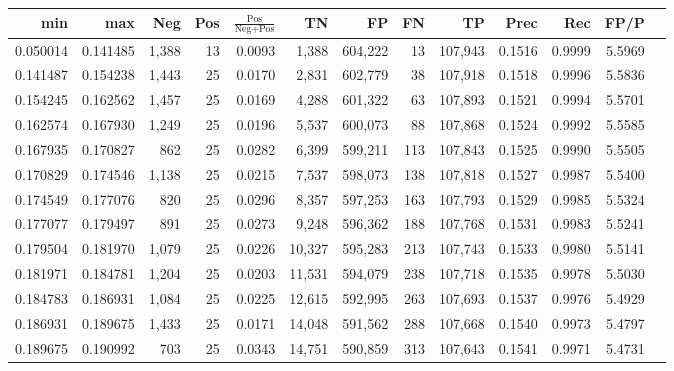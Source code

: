 \begin{tabular}{rrrrrrrrrrrrr}
\toprule
     min &      max &   Neg & Pos & $\frac{\text{Pos}}{\text{Neg}+\text{Pos}}$ &      TN &      FP &      FN &      TP &   Prec &    Rec &   FP/P \\
\midrule
0.050014 & 0.141485 & 1,388 &  13 &                                     0.0093 &   1,388 & 604,222 &      13 & 107,943 & 0.1516 & 0.9999 & 5.5969 \\
0.141487 & 0.154238 & 1,443 &  25 &                                     0.0170 &   2,831 & 602,779 &      38 & 107,918 & 0.1518 & 0.9996 & 5.5836 \\
0.154245 & 0.162562 & 1,457 &  25 &                                     0.0169 &   4,288 & 601,322 &      63 & 107,893 & 0.1521 & 0.9994 & 5.5701 \\
0.162574 & 0.167930 & 1,249 &  25 &                                     0.0196 &   5,537 & 600,073 &      88 & 107,868 & 0.1524 & 0.9992 & 5.5585 \\
0.167935 & 0.170827 &   862 &  25 &                                     0.0282 &   6,399 & 599,211 &     113 & 107,843 & 0.1525 & 0.9990 & 5.5505 \\
0.170829 & 0.174546 & 1,138 &  25 &                                     0.0215 &   7,537 & 598,073 &     138 & 107,818 & 0.1527 & 0.9987 & 5.5400 \\
0.174549 & 0.177076 &   820 &  25 &                                     0.0296 &   8,357 & 597,253 &     163 & 107,793 & 0.1529 & 0.9985 & 5.5324 \\
0.177077 & 0.179497 &   891 &  25 &                                     0.0273 &   9,248 & 596,362 &     188 & 107,768 & 0.1531 & 0.9983 & 5.5241 \\
0.179504 & 0.181970 & 1,079 &  25 &                                     0.0226 &  10,327 & 595,283 &     213 & 107,743 & 0.1533 & 0.9980 & 5.5141 \\
0.181971 & 0.184781 & 1,204 &  25 &                                     0.0203 &  11,531 & 594,079 &     238 & 107,718 & 0.1535 & 0.9978 & 5.5030 \\
0.184783 & 0.186931 & 1,084 &  25 &                                     0.0225 &  12,615 & 592,995 &     263 & 107,693 & 0.1537 & 0.9976 & 5.4929 \\
0.186931 & 0.189675 & 1,433 &  25 &                                     0.0171 &  14,048 & 591,562 &     288 & 107,668 & 0.1540 & 0.9973 & 5.4797 \\
0.189675 & 0.190992 &   703 &  25 &                                     0.0343 &  14,751 & 590,859 &     313 & 107,643 & 0.1541 & 0.9971 & 5.4731 \\

\end{tabular}
